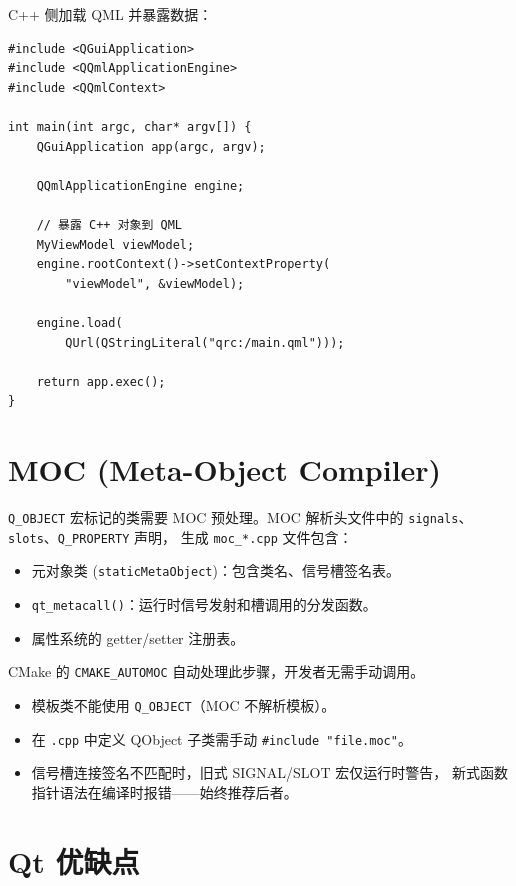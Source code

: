 \documentclass[12pt,a4paper,fontset=fandol]{ctexbook}
\newcommand{\cpplabel}{%
  \tcbox[on line,colback=cppheadbg,colframe=cppheadbg,
    boxrule=0pt,arc=1pt,left=2pt,right=2pt,top=1pt,bottom=1pt,
    colupper=white,fontupper=\scriptsize\bfseries]{C++}}
\newcommand{\Fn}[1]{\texttt{#1()}}
\newcommand{\Tp}[1]{\texttt{#1}}
\begin{document}
C++ 侧加载 QML 并暴露数据：

\cpplabel
\begin{lstlisting}[style=cppstyle]
#include <QGuiApplication>
#include <QQmlApplicationEngine>
#include <QQmlContext>

int main(int argc, char* argv[]) {
    QGuiApplication app(argc, argv);

    QQmlApplicationEngine engine;

    // 暴露 C++ 对象到 QML
    MyViewModel viewModel;
    engine.rootContext()->setContextProperty(
        "viewModel", &viewModel);

    engine.load(
        QUrl(QStringLiteral("qrc:/main.qml")));

    return app.exec();
}
\end{lstlisting}

\section{MOC (Meta-Object Compiler)}

\Tp{Q\_OBJECT} 宏标记的类需要 MOC 预处理。MOC 解析头文件中的
\texttt{signals}、\texttt{slots}、\Tp{Q\_PROPERTY} 声明，
生成 \texttt{moc\_*.cpp} 文件包含：

\begin{itemize}
  \item 元对象类 (\Tp{staticMetaObject})：包含类名、信号槽签名表。
  \item \Fn{qt\_metacall}：运行时信号发射和槽调用的分发函数。
  \item 属性系统的 getter/setter 注册表。
\end{itemize}

CMake 的 \Tp{CMAKE\_AUTOMOC} 自动处理此步骤，开发者无需手动调用。

\begin{warning}[title=MOC 常见陷阱]
\begin{itemize}
  \item 模板类不能使用 \Tp{Q\_OBJECT}（MOC 不解析模板）。
  \item 在 \texttt{.cpp} 中定义 QObject 子类需手动 \texttt{\#include "file.moc"}。
  \item 信号槽连接签名不匹配时，旧式 SIGNAL/SLOT 宏仅运行时警告，
        新式函数指针语法在编译时报错——始终推荐后者。
\end{itemize}
\end{warning}

\section{Qt 优缺点}
\end{document}
